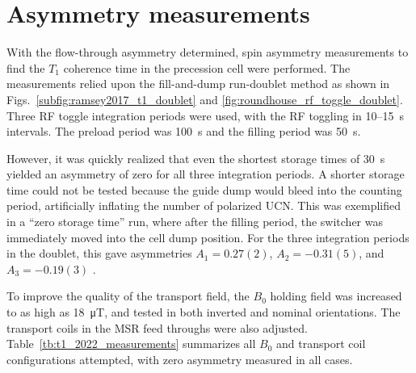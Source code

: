 
\section{Asymmetry measurements}\label{sec:2022_asymmetry}


With the flow-through asymmetry determined, spin asymmetry measurements to find the $T_1$ coherence time in the precession cell were performed. The measurements relied upon the fill-and-dump run-doublet method as shown in Figs.~\ref{subfig:ramsey2017_t1_doublet} and \ref{fig:roundhouse_rf_toggle_doublet}. Three RF toggle integration periods were used, with the RF toggling in 10--\qty{15}{s} intervals. The preload period was \qty{100}{s} and the filling period was \qty{50}{s}.

However, it was quickly realized that even the shortest storage times of \qty{30}{s} yielded an asymmetry of zero for all three integration periods. A shorter storage time could not be tested because the guide dump would bleed into the counting period, artificially inflating the number of polarized UCN. This was exemplified in a ``zero storage time'' run, where after the filling period, the switcher was immediately moved into the cell dump position. For the three integration periods in the doublet, this gave asymmetries $A_1=0.27(2)$, $A_2=-0.31(5)$, and $A_3=-0.19(3)$ .

To improve the quality of the transport field, the $B_0$ holding field was increased to as high as \qty{18}{\micro T}, and tested in both inverted and nominal orientations. The transport coils in the MSR feed throughs were also adjusted. Table~\ref{tb:t1_2022_measurements} summarizes all $B_0$ and transport coil configurations attempted, with zero asymmetry measured in all cases.


